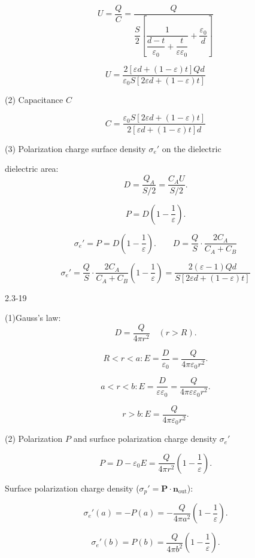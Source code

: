 \documentclass{article}
\begin{document}
$$U = \frac{Q}{C} = \frac{Q}{\dfrac{S}{2} \left[ \dfrac{1}{\dfrac{d-t}{\varepsilon_0} + \dfrac{t}{\varepsilon\varepsilon_0}} + \dfrac{\varepsilon_0}{d} \right]}$$

$$U=\frac{2[\varepsilon d+(1-\varepsilon)t]Qd}{\varepsilon_0S[2\varepsilon d+(1-\varepsilon)t]}$$


(2) Capacitance $ C $

$$C = \frac{\varepsilon_0S[2\varepsilon d+(1-\varepsilon)t]}{2[\varepsilon d+(1-\varepsilon)t]d} $$



(3) Polarization charge surface density $ \sigma_e' $ on the dielectric

dielectric area:
$$D = \frac{Q_A}{S/2} = \frac{C_A U}{S/2}.$$

$$P = D \left( 1 - \frac{1}{\varepsilon} \right).$$

$$\sigma_e' = P = D \left( 1 - \frac{1}{\varepsilon} \right).\qquad D = \dfrac{Q}{S} \cdot \dfrac{2C_A}{C_A + C_B} $$

$$\sigma_e' = \frac{Q}{S} \cdot \frac{2C_A}{C_A + C_B} \left( 1 - \frac{1}{\varepsilon} \right)=\frac{2(\varepsilon-1)Qd}{S[2\varepsilon d+(1-\varepsilon)t]}$$






\newpage

2.3-19



(1)Gauss’s law:
$$D = \frac{Q}{4\pi r^2} \quad (r > R).$$

$$ R < r < a :E = \frac{D}{\varepsilon_0} = \frac{Q}{4\pi\varepsilon_0 r^2}.$$

$$ a < r < b :E = \frac{D}{\varepsilon\varepsilon_0} = \frac{Q}{4\pi\varepsilon\varepsilon_0 r^2}.$$

$$ r > b :E = \frac{Q}{4\pi\varepsilon_0 r^2}.$$

\vspace{1.5em}

(2) Polarization $ P $ and surface polarization charge density $ \sigma_e' $

$$P = D - \varepsilon_0 E = \frac{Q}{4\pi r^2} \left( 1 - \frac{1}{\varepsilon} \right).$$

Surface polarization charge density ($ \sigma_p' = \mathbf{P} \cdot \mathbf{n}_{\text{out}} $):

$$\sigma_e'(a) = -P(a) = -\frac{Q}{4\pi a^2} \left( 1 - \frac{1}{\varepsilon} \right).$$

$$\sigma_e'(b) = P(b) = \frac{Q}{4\pi b^2} \left( 1 - \frac{1}{\varepsilon} \right).$$
\end{document}
